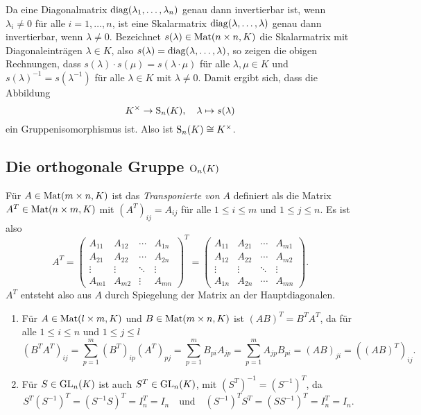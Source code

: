 \begin{bem}
 Da eine Diagonalmatrix $\mathrm{diag}(\lambda_1, \dotsc, \lambda_n)$ genau dann invertierbar ist, wenn $\lambda_i \neq 0$ für alle $i = 1, \dotsc, n$, ist eine Skalarmatrix $\mathrm{diag}(\lambda, \dotsc, \lambda)$ genau dann invertierbar, wenn $\lambda \neq 0$. Bezeichnet $s(\lambda) \in \mathrm{Mat}(n \times n, K)$ die Skalarmatrix mit Diagonaleinträgen $\lambda \in K$, also $s(\lambda) = \mathrm{diag}(\lambda, \dotsc, \lambda)$, so zeigen die obigen Rechnungen, dass $s(\lambda) \cdot s(\mu) = s(\lambda \cdot \mu)$ für alle $\lambda, \mu \in K$ und $s(\lambda)^{-1} = s(\lambda^{-1})$ für alle $\lambda \in K$ mit $\lambda \neq 0$. Damit ergibt sich, dass die Abbildung
 \[
  K^\times \to \mathrm{S}_n(K), \quad \lambda \mapsto s(\lambda)
 \]
 ein Gruppenisomorphismus ist. Also ist $\mathrm{S}_n(K) \cong K^\times$.
\end{bem}



\subsection{Die orthogonale Gruppe \texorpdfstring{$\mathrm{O}_n(K)$}{On(K)}}

\begin{defi}
 Für $A \in \mathrm{Mat}(m \times n, K)$ ist das \emph{Transponierte von $A$} definiert als die Matrix $A^T \in \mathrm{Mat}(n \times m, K)$ mit $(A^T)_{ij} = A_{ij}$ für alle $1 \leq i \leq m$ und $1 \leq j \leq n$. Es ist also
 \[
  A^T
  =
  \begin{pmatrix}
   A_{11} & A_{12} & \cdots & A_{1n} \\
   A_{21} & A_{22} & \cdots & A_{2n} \\
   \vdots & \vdots & \ddots & \vdots \\
   A_{m1} & A_{m2} & \vdots & A_{mn}
  \end{pmatrix}^T
  =
  \begin{pmatrix}
   A_{11} & A_{21} & \cdots & A_{m1} \\
   A_{12} & A_{22} & \cdots & A_{m2} \\
   \vdots & \vdots & \ddots & \vdots \\
   A_{1n} & A_{2n} & \cdots & A_{mn}
  \end{pmatrix}.
 \]
 $A^T$ entsteht also aus $A$ durch Spiegelung der Matrix an der Hauptdiagonalen.
\end{defi}

\begin{bem}
 \begin{enumerate}[leftmargin=*]
  \item
   Für $A \in \mathrm{Mat}(l \times m, K)$ und $B \in \mathrm{Mat}(m \times n, K)$ ist $(AB)^T = B^T A^T$, da für alle $1 \leq i \leq n$ und $1 \leq j \leq l$
   \[
    (B^T A^T)_{ij}
    = \sum_{p=1}^m (B^T)_{ip} (A^T)_{pj}
    = \sum_{p=1}^m B_{pi} A_{jp}
    = \sum_{p=1}^m A_{jp} B_{pi}
    = (AB)_{ji}
    = ((AB)^T)_{ij}.
   \]
  \item
   Für $S \in \mathrm{GL}_n(K)$ ist auch $S^T \in \mathrm{GL}_n(K)$, mit $(S^T)^{-1} = (S^{-1})^T$, da
   \[
    S^T (S^{-1})^T = (S^{-1} S)^T = I_n^T = I_n
    \quad\text{und}\quad
    (S^{-1})^T S^T = (S S^{-1})^T = I_n^T = I_n.
   \]
 \end{enumerate}
\end{bem}

